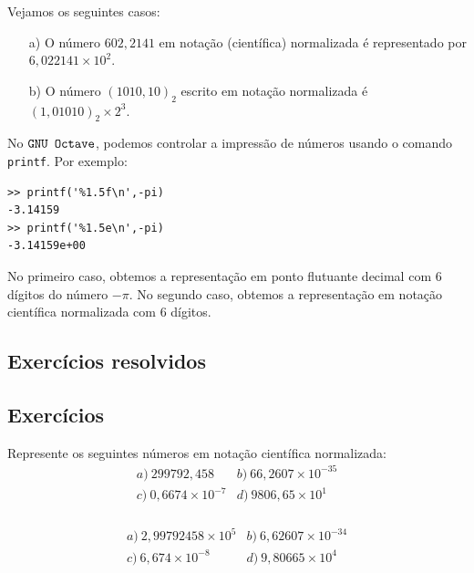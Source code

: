 \begin{ex} Vejamos os seguintes casos:
  \begin{itemize}
  \item[a)] O número $602,2141$ em notação (científica) normalizada é representado por $6,022141\times 10^{2}$.
  \item[b)] O número $(1010,10)_2$ escrito em notação normalizada é $(1,01010)_2\times 2^3$.
  \end{itemize}
\end{ex}

\begin{obs}
No $\verb+GNU Octave+$, podemos controlar a impressão de números usando o comando \verb+printf+. Por exemplo:
\begin{verbatim}
>> printf('%1.5f\n',-pi)
-3.14159
>> printf('%1.5e\n',-pi)
-3.14159e+00
\end{verbatim}
No primeiro caso, obtemos a representação em ponto flutuante decimal com $6$ dígitos do número $-\pi$. No segundo caso, obtemos a representação em notação científica normalizada com $6$ dígitos.
\end{obs}

\subsection*{Exercícios resolvidos}

\construirExeresol

\subsection*{Exercícios}

\construirExer

\begin{exer}\label{exer:notacao_cientifica_normalizada}
  Represente os seguintes números em notação científica normalizada:
  \begin{equation}
    \begin{array}{ll}
      a)~299792,458 & b)~66,2607\times 10^{-35}\\
      c)~0,6674\times 10^{-7} & d)~9806,65\times 10^{1}
    \end{array}
  \end{equation}
  \begin{eqnarray}
  \end{eqnarray}
\end{exer}
\begin{resp}
  \begin{equation}
  \begin{array}{ll}
    a)~2,99792458\times 10^5 & b)~6,62607\times 10^{-34}\\
    c)~6,674\times 10^{-8} & d)~9,80665\times 10^4
  \end{array}
  \end{equation}
\end{resp}

